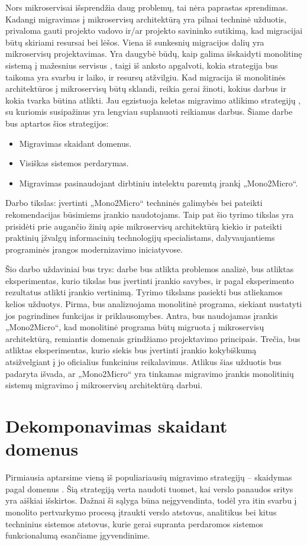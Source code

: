 \documentclass{VUMIFPSbakalaurinis}
\begin{document}
Nors mikroservisai išsprendžia daug problemų, tai nėra paprastas sprendimas. Kadangi migravimas į mikroservisų architektūrą yra pilnai techninė užduotis, privaloma gauti projekto vadovo ir/ar projekto savininko sutikimą, kad migracijai būtų skiriami resursai bei lėšos. Viena iš sunkesnių migracijos dalių yra mikroservisų projektavimas. Yra daugybė būdų, kaip galima išskaidyti monolitinę sistemą į mažesnius servisus \cite{FBZ+19}, taigi iš anksto apgalvoti, kokia strategija bus taikoma yra svarbu ir laiko, ir resursų atžvilgiu. Kad migracija iš monolitinės architektūros į mikroservisų būtų sklandi, reikia gerai žinoti, kokius darbus ir kokia tvarka būtina atlikti. Jau egzistuoja keletas migravimo atlikimo strategijų \cite{Wal22,MQO18,KXL+20}, su kuriomis susipažinus yra lengviau suplanuoti reikiamus darbus. Šiame darbe bus aptartos šios strategijos:
\begin{itemize}
    \item Migravimas skaidant domenus.
    \item Visiškas sistemos perdarymas.
    \item Migravimas pasinaudojant dirbtiniu intelektu paremtą įrankį „Mono2Micro“.
\end{itemize}

Darbo tikslas: įvertinti „Mono2Micro“ techninės galimybės bei pateikti rekomendacijas būsimiems įrankio naudotojams. Taip pat šio tyrimo tikslas yra prisidėti prie augančio žinių apie mikroservisų architektūrą kiekio ir pateikti praktinių įžvalgų informacinių technologijų specialistams, dalyvaujantiems programinės įrangos modernizavimo iniciatyvose.

Šio darbo uždaviniai bus trys: darbe bus atlikta problemos analizė, bus atliktas eksperimentas, kurio tikslas bus įvertinti įrankio savybes, ir pagal eksperimento rezultatus atlikti įrankio vertinimą. Tyrimo tikslams pasiekti bus atliekamos kelios užduotys. Pirma, bus analizuojama monolitinė programa, siekiant nustatyti jos pagrindines funkcijas ir priklausomybes. Antra, bus naudojamas įrankis „Mono2Micro“, kad monolitinė programa būtų migruota į mikroservisų architektūrą, remiantis domenais grindžiamo projektavimo principais. Trečia, bus atliktas eksperimentas, kurio siekis bus įvertinti įrankio kokybiškumą atsižvelgiant į jo oficialius funkcinius reikalavimus. Atlikus šias užduotis bus padaryta išvada, ar „Mono2Micro“ yra tinkamas migravimo įrankis monolitinių sistemų migravimo į mikroservisų architektūrą darbui.

\section{Dekomponavimas skaidant domenus}
Pirmiausia aptarsime vieną iš populiariausių migravimo strategijų – skaidymas pagal domenus \cite{Wal22}. Šią strategiją verta naudoti tuomet, kai verslo panaudos sritys yra aiškiai išskirtos. Dažnai  ši sąlyga būna neįgyvendinta, todėl yra itin svarbu į monolito pertvarkymo procesą įtraukti verslo atstovus, analitikus bei kitus techninius sistemos atstovus, kurie gerai supranta perdaromos sistemos funkcionalumą esančiame įgyvendinime.
\end{document}

